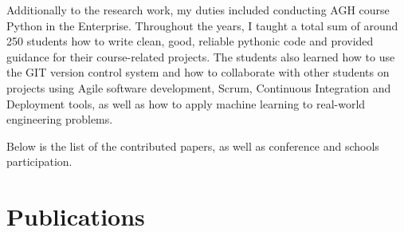 Additionally to the research work, my duties included conducting AGH course Python in the Enterprise. Throughout the years, I taught a total sum of around 250 students how to write clean, good, reliable pythonic code and provided guidance for their course-related projects. The students also learned how to use the GIT version control system and how to collaborate with other students on projects using Agile software development, Scrum, Continuous Integration and Deployment tools, as well as how to apply machine learning to real-world engineering problems.

Below is the list of the contributed papers, as well as conference and schools participation.


\section*{Publications}
